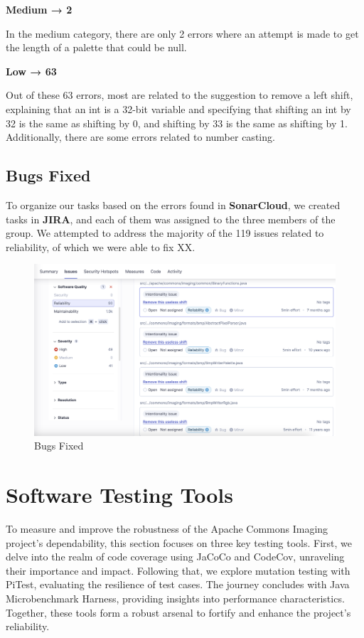 \documentclass[sigconf]{acmart}
\begin{document}
\textbf{Medium → 2}

In the medium category, there are only 2 errors where an attempt is made to get the length of a palette that could be null.

\textbf{Low → 63}

Out of these 63 errors, most are related to the suggestion to remove a left shift, explaining that an int is a 32-bit variable and specifying that shifting an int by 32 is the same as shifting by 0, and shifting by 33 is the same as shifting by 1. Additionally, there are some errors related to number casting.

\subsection{Bugs Fixed}

To organize our tasks based on the errors found in \textbf{SonarCloud}, we created tasks in \textbf{JIRA}, and each of them was assigned to the three members of the group. We attempted to address the majority of the 119 issues related to reliability, of which we were able to fix XX.

\begin{figure}[h!]
    \centering
    \includegraphics[width=1\linewidth]{reportSonarCloudFixed.png}
    \caption{Bugs Fixed}
    \label{fig:enter-label}
\end{figure}


\section{Software Testing Tools}

To measure and improve the robustness of the Apache Commons Imaging project's dependability, this section focuses on three key testing tools. First, we delve into the realm of code coverage using JaCoCo and CodeCov, unraveling their importance and impact. Following that, we explore mutation testing with PiTest, evaluating the resilience of test cases. The journey concludes with Java Microbenchmark Harness, providing insights into performance characteristics. Together, these tools form a robust arsenal to fortify and enhance the project's reliability.
\end{document}

